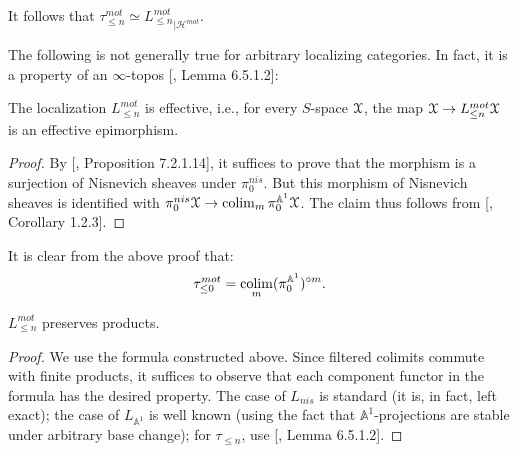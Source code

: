 \begin{rem}
    It follows that $\tau_{\leq n}^{mot}\simeq {L_{\leq n}^{mot}}_{|\mathcal{H}^{mot}}$.
\end{rem}

The following is not generally true for arbitrary localizing categories. In fact, it is a property of an $\infty$-topos [\cite{lurie2009higher}, Lemma 6.5.1.2]:  
 \begin{prop}
     The localization $L_{\leq n}^{mot}$ is effective, i.e., for every $S$-space $\EuScript{X}$, the map $\EuScript{X}\to L_{\leq n}^{mot}\EuScript{X}$ is an effective epimorphism.
 \end{prop} 
 \begin{proof}
  By [\cite{lurie2009higher}, Proposition 7.2.1.14], it suffices to prove that the morphism is a surjection of Nisnevich sheaves under $\pi_0^{nis}$. But this morphism of Nisnevich sheaves is identified with $\pi_0^{nis}\EuScript{X}\to \operatorname*{colim}_{m}\pi_0^{\mathbb{A}^1}\EuScript{X}$. The claim thus follows from [\cite{morel19991}, Corollary 1.2.3].
 \end{proof}
 \begin{rem}
    It is clear from the above proof that:
    $$\tau_{\leq 0}^{mot}=\operatorname*{colim}_{m}(\pi_0^{\mathbb{A}^1})^{\circ m}.$$
\end{rem} 

\begin{prop}
    $L^{mot}_{\leq n}$ preserves products. 
\end{prop}
\begin{proof}
    We use the formula constructed above. Since filtered colimits commute with finite products, it suffices to observe that each component functor in the formula has the desired property. The case of $L_{nis}$ is standard (it is, in fact, left exact); the case of $L_{\mathbb{A}^1}$ is well known (using the fact that $\mathbb{A}^1$-projections are stable under arbitrary base change); for $\tau_{\leq n}$, use [\cite{lurie2009higher}, Lemma 6.5.1.2].
\end{proof}

